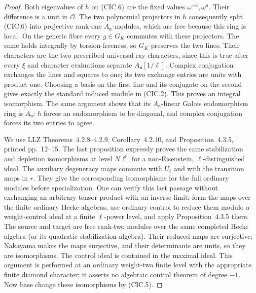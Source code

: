 \begin{proof}
Both eigenvalues of $h$ on (CIC.6) are the
fixed values $\omega^{-a},\omega^a$.  Their difference is
a unit in $\mathcal O$.  The two polynomial projectors in
$h$ consequently split (CIC.6) into projective rank-one
$A_{\mathfrak n}$-modules, which are free because this
ring is local.  On the generic fibre every $g\in G_K$
commutes with these projectors.  The same holds integrally
by torsion-freeness, so $G_K$ preserves the two lines.
Their characters are the two prescribed universal ray
characters, since this is true after every $\xi$ and
character evaluations separate $A_{\mathfrak n}[1/\ell]$.
Complex conjugation exchanges the lines and squares to
one; its two exchange entries are units with product one.
Choosing a basis on the first line and its conjugate on
the second gives exactly the standard induced module in
(CIC.2).  This proves an integral isomorphism.  The same
argument shows that its $A_{\mathfrak n}$-linear Galois
endomorphism ring is $A_{\mathfrak n}$: $h$ forces an
endomorphism to be diagonal, and complex conjugation
forces its two entries to agree.

We use LLZ Theorems~4.2.8--4.2.9, Corollary~4.2.10,
and Proposition~4.3.5, printed pp.~12--15.  The last
proposition expressly proves the same stabilization and
depletion isomorphisms at level $N\ell^r$ for a
non-Eisenstein, $\ell$-distinguished ideal.  The auxiliary
degeneracy maps commute with $U_\ell$ and with the
transition maps in $r$.
They give the corresponding isomorphisms for the full
ordinary modules before specialization.  One can verify
this last passage without exchanging an arbitrary tensor
product with an inverse limit: form the maps over the
finite ordinary Hecke algebras, use ordinary control to
reduce them modulo a weight-control ideal at a finite
$\ell$-power level, and apply Proposition~4.3.5 there.
The source and target are free rank-two modules over the
same completed Hecke algebra (or its quadratic
stabilization algebra).  Their reduced maps are
surjective; Nakayama makes the maps surjective, and their
determinants are units, so they are isomorphisms.  The
control ideal is contained in the maximal ideal.  This
argument is performed at an ordinary weight-two finite
level with the appropriate finite diamond character;
it asserts no algebraic control theorem of degree $-1$.
Now base change these isomorphisms by (CIC.5).


\end{proof}

